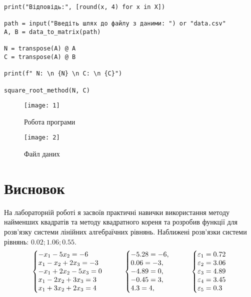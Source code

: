 \documentclass{article}
\begin{document}
\begin{large}
\begin{lstlisting}
print("Відповідь:", [round(x, 4) for x in X])

path = input("Введіть шлях до файлу з даними: ") or "data.csv"
A, B = data_to_matrix(path)

N = transpose(A) @ A
C = transpose(A) @ B

print(f" N: \n {N} \n C: \n {C}")

square_root_method(N, C)\end{lstlisting}
		\pagebreak
		\begin{figure}[h!]
			\centering
			\texttt{[image: 1]}
			\caption{Робота програми}
		\end{figure}
		\begin{figure}[h!]
			\centering
			\texttt{[image: 2]}
			\caption{Файл даних}
		\end{figure}
		\section*{Висновок}
		На лабораторній роботі я засвоїв практичні навички використання методу найменших квадратів та методу квадратного кореня та розробив функції для розв’язку системи лінійних алгебраїчних рівнянь.
		Наближені розв'язки системи рівнянь: $0.02; 1.06; 0.55$.
		\begin{gather}\nonumber
			\left\{\begin{array}{@{}l@{}}
				-x_1-5x_2=-6\\\nonumber
				x_1-x_2+2x_3=-3\\\nonumber
				-x_1+2x_2-5x_3=0\\\nonumber
				x_1-2x_2+3x_3=3\\\nonumber
				x_1+3x_2+2x_3=4\nonumber
			\end{array}\right.\,
			\hspace{28pt}
			\left\{\begin{array}{@{}l@{}}
				-5.28=-6,\\\nonumber
				0.06=-3,\\\nonumber
				-4.89=0,\\\nonumber
				-0.45=3,\\\nonumber
				4.3=4,\nonumber
			\end{array}\right.\,
			\hspace{28pt}
			\left\{\begin{array}{@{}l@{}}
				\varepsilon_1=0.72\\\nonumber
				\varepsilon_2=3.06\\\nonumber
				\varepsilon_3=4.89\\\nonumber
				\varepsilon_4=3.45\\\nonumber
				\varepsilon_5=0.3\nonumber
			\end{array}\right.\,			
		\end{gather} 
	\end{large}
\end{document}
